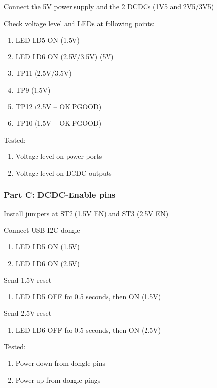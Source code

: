 Connect the 5V power supply and the 2 DCDCs (1V5 and 2V5/3V5)

Check voltage level and LEDs at following points:

\begin{enumerate}
    \item LED LD5 ON (1.5V)
    \item LED LD6 ON (2.5V/3.5V)
     (5V)
    \item TP11 (2.5V/3.5V)
    \item TP9 (1.5V)
    \item TP12 (2.5V – OK PGOOD)
    \item TP10 (1.5V – OK PGOOD)
\end{enumerate}

Tested:
\begin{enumerate}
    \item Voltage level on power ports
    \item Voltage level on DCDC outputs
\end{enumerate}

\subsubsection{Part C: DCDC-Enable pins}

Install jumpers at ST2 (1.5V EN) and ST3 (2.5V EN)

Connect USB-I2C dongle

\begin{enumerate}
    \item LED LD5 ON (1.5V)
    \item LED LD6 ON (2.5V)
\end{enumerate}

Send 1.5V reset
\begin{enumerate}
    \item LED LD5 OFF for 0.5 seconds, then ON (1.5V)
\end{enumerate}

Send 2.5V reset
\begin{enumerate}
    \item LED LD6 OFF for 0.5 seconds, then ON (2.5V)
\end{enumerate}

Tested:
\begin{enumerate}
    \item Power-down-from-dongle pins
    \item Power-up-from-dongle pings
\end{enumerate}


